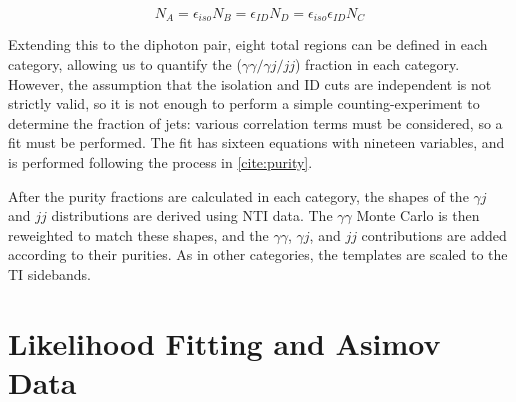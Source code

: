 \begin{equation}
N_{A} = \epsilon_{iso} N_{B} = \epsilon_{ID} N_{D} = \epsilon_{iso} \epsilon_{ID} N_{C}
\end{equation} 

Extending this to the diphoton pair, eight total regions can be defined in each category, allowing us to quantify the ($\gamma \gamma / \gamma j/jj$) fraction in each category. However, the assumption that the isolation and ID cuts are independent is not strictly valid, so it is not enough to perform a simple counting-experiment to determine the fraction of jets: various correlation terms must be considered, so a fit must be performed. The fit has sixteen equations with nineteen variables, and is performed following the process in \ref{cite:purity}.

After the purity fractions are calculated in each category, the shapes of the $\gamma j$ and $jj$ distributions are derived using NTI data. The $\gamma \gamma$ Monte Carlo is then reweighted to match these shapes, and the $\gamma \gamma$, $\gamma j$, and $jj$ contributions are added according to their purities. As in other categories, the templates are scaled to the TI sidebands. 

\section{Likelihood Fitting and Asimov Data} \label{sec:likelihoodfit} 








